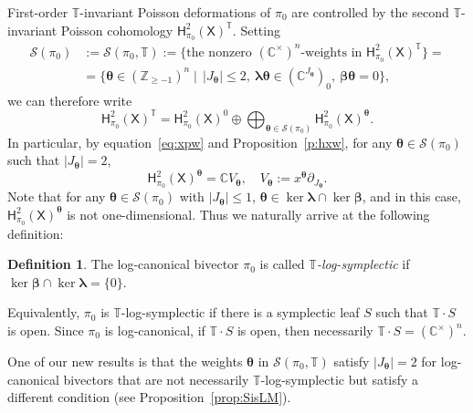 \documentclass[11pt]{article}
\newcommand{\bbeta}{\boldsymbol{\beta}}
\newcommand{\blambda}{\boldsymbol{\lambda}}
\newcommand{\btheta}{{\boldsymbol{\theta}}}
\theoremstyle{definition}\newtheorem{definition}[theorem]{Definition}
\theoremstyle{definition}\newtheorem{remark}[theorem]{Remark}
\theoremstyle{remark}
\numberwithin{equation}{section}
\begin{document}
First-order $\mathbb{T}$-invariant Poisson deformations of $\pi_0$ are controlled by the second $\mathbb{T}$-invariant Poisson cohomology $\mathsf{H}^2_{\pi_0}(\mathsf{X})^{\mathbb{T}}$. Setting
\begin{equation}\label{eq:spi0}
\begin{split}
    \mathcal{S}(\pi_0) &:= \mathcal{S}(\pi_0,\mathbb{T}) := \{ \text{the nonzero }(\mathbb{C}^\times)^n\text{-weights in } \mathsf{H}^2_{\pi_0}(\mathsf{X})^{\mathbb{T}}\} = \\ &= \{\btheta \in (\mathbb{Z}_{\geq -1})^n \mid \, |J_{\btheta}| \leq 2, \ \blambda \btheta \in (\mathbb{C}^{J_{\btheta}})_0, \  \bbeta \btheta = 0\},
    \end{split}
\end{equation}
we can therefore write
\begin{equation*}
    \mathsf{H}^2_{\pi_0}(\mathsf{X})^{\mathbb{T}} = \mathsf{H}^2_{\pi_0}(\mathsf{X})^{0} \oplus \bigoplus_{\btheta \in \mathcal{S}(\pi_0)} \mathsf{H}^2_{\pi_0}(\mathsf{X})^{\btheta}.
\end{equation*}
In particular, by equation~\eqref{eq:xpw} and Proposition~\ref{p:hxw}, for any $\btheta \in \mathcal{S}(\pi_0)$ such that $|J_{\btheta}| = 2$,
\begin{equation}\label{eq:coh1}
    \mathsf{H}_{\pi_0}^2(\mathsf{X})^{\btheta} = \mathbb{C}V_{\btheta}, \quad V_{\btheta} := x^{\btheta} \partial_{J_{\btheta}}.
\end{equation}
Note that for any $\btheta \in \mathcal{S}(\pi_0)$ with $|J_{\btheta}| \leq 1$, $\btheta \in \ker \blambda \cap \ker \bbeta$, and in this case, $\mathsf{H}_{\pi_0}^2(\mathsf{X})^{\btheta}$ is not one-dimensional. Thus we naturally arrive at the following definition:
\begin{definition}
    The log-canonical bivector $\pi_0$ is called \emph{$\mathbb{T}$-log-symplectic} if $\ker \bbeta \cap \ker \blambda = \{0\}$.
\end{definition}
Equivalently, $\pi_0$ is $\mathbb{T}$-log-symplectic if there is a symplectic leaf $S$ such that $\mathbb{T}\cdot S$ is open. Since $\pi_0$ is log-canonical, if $\mathbb{T}\cdot S$ is open, then necessarily $\mathbb{T}\cdot S = (\mathbb{C}^\times)^n$.

One of our new results is that the weights $\btheta$ in $\mathcal{S}(\pi_0,\mathbb{T})$ satisfy $|J_{\btheta}| = 2$ for log-canonical bivectors that are not necessarily $\mathbb{T}$-log-symplectic but satisfy a different condition (see Proposition~\ref{prop:SisLM}).
\end{document}
